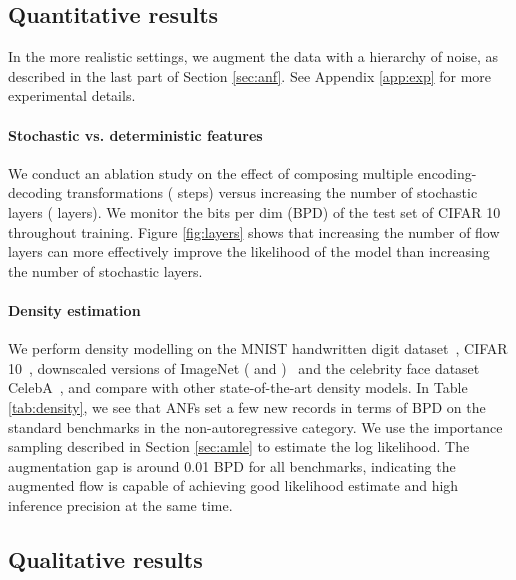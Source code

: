 \documentclass{article}
\begin{document}
\subsection{Quantitative results}
In the more realistic settings, we augment the data with a hierarchy of noise, as described in the last part of Section \ref{sec:anf}. 
See Appendix \ref{app:exp} for more experimental details. 

\paragraph{Stochastic vs. deterministic features} We conduct an ablation study on the effect of composing multiple encoding-decoding transformations ( steps) versus increasing the number of stochastic layers ( layers). 
We monitor the bits per dim (BPD) of the test set of CIFAR 10~\citep{krizhevsky2009learning} throughout training.
Figure \ref{fig:layers} shows that increasing the number of flow layers can more effectively improve the likelihood of the model than increasing the number of stochastic layers.

\paragraph{Density estimation}
We perform density modelling on the MNIST handwritten digit dataset~\citep{lecun1998gradient}, CIFAR 10~\citep{krizhevsky2009learning}, downscaled versions of ImageNet ( and )~\citep{oord2016pixel} and the celebrity face dataset CelebA~\citep{liu2015faceattributes}, and compare with other state-of-the-art density models.  
In Table \ref{tab:density}, we see that ANFs set a few new records in terms of BPD on the standard benchmarks in the non-autoregressive category.
We use the importance sampling described in Section \ref{sec:amle} to estimate the log likelihood. 
The augmentation gap is around 0.01 BPD for all benchmarks, indicating the augmented flow is capable of achieving good likelihood estimate and high inference precision at the same time. 

\subsection{Qualitative results}
\end{document}

